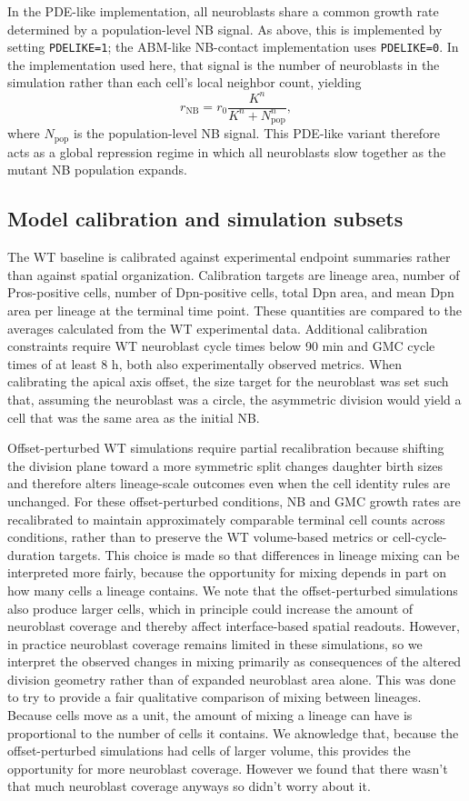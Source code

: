 In the PDE-like implementation, all neuroblasts share a common growth rate determined by a population-level NB signal.
As above, this is implemented by setting \texttt{PDELIKE=1}; the ABM-like NB-contact implementation uses \texttt{PDELIKE=0}.
In the implementation used here, that signal is the number of neuroblasts in the simulation rather than each cell's local neighbor count, yielding
\[
r_{\mathrm{NB}} = r_0\frac{K^n}{K^n + N_{\mathrm{pop}}^n},
\]
where \(N_{\mathrm{pop}}\) is the population-level NB signal.
This PDE-like variant therefore acts as a global repression regime in which all neuroblasts slow together as the mutant NB population expands.

\subsection{Model calibration and simulation subsets}

The WT baseline is calibrated against experimental endpoint summaries rather than against spatial organization.
Calibration targets are lineage area, number of Pros-positive cells, number of Dpn-positive cells, total Dpn area, and mean Dpn area per lineage at the terminal time point.
These quantities are compared to the averages calculated from the WT experimental data.
Additional calibration constraints require WT neuroblast cycle times below 90 min and GMC cycle times of at least 8 h, both also experimentally observed metrics.
When calibrating the apical axis offset, the size target for the neuroblast was set such that, assuming the neuroblast was a circle, the asymmetric division would yield a cell that was the same area as the initial NB.

Offset-perturbed WT simulations require partial recalibration because shifting the division plane toward a more symmetric split changes daughter birth sizes and therefore alters lineage-scale outcomes even when the cell identity rules are unchanged.
For these offset-perturbed conditions, NB and GMC growth rates are recalibrated to maintain approximately comparable terminal cell counts across conditions, rather than to preserve the WT volume-based metrics or cell-cycle-duration targets.
This choice is made so that differences in lineage mixing can be interpreted more fairly, because the opportunity for mixing depends in part on how many cells a lineage contains.
We note that the offset-perturbed simulations also produce larger cells, which in principle could increase the amount of neuroblast coverage and thereby affect interface-based spatial readouts.
However, in practice neuroblast coverage remains limited in these simulations, so we interpret the observed changes in mixing primarily as consequences of the altered division geometry rather than of expanded neuroblast area alone.
This was done to try to provide a fair qualitative comparison of mixing between lineages.
Because cells move as a unit, the amount of mixing a lineage can have is proportional to the number of cells it contains.
We aknowledge that, because the offset-perturbed simulations had cells of larger volume, this provides the opportunity for more neuroblast coverage.
However we found that there wasn't that much neuroblast coverage anyways so didn't worry about it.

